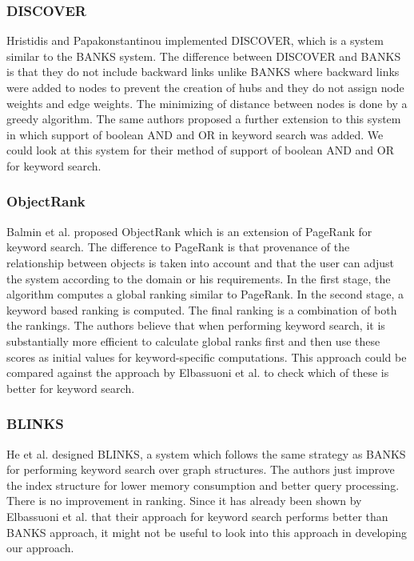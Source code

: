 \documentclass{article}
\begin{document}
    \subsubsection{DISCOVER}
    Hristidis and Papakonstantinou\cite{hristidis02} implemented DISCOVER, which is a system similar to the BANKS system. The difference between DISCOVER and BANKS is that they do not include backward links unlike BANKS where backward links were added to nodes to prevent the creation of hubs and they do not assign node weights and edge weights. The minimizing of distance between nodes is done by a greedy algorithm. The same authors proposed a further extension to this system\cite{hristidis03} in which support of boolean AND and OR in keyword search was added. We could look at this system for their method of support of boolean AND and OR for keyword search.

    \subsubsection{ObjectRank}
    Balmin et al.\cite{balmin04} proposed ObjectRank which is an extension of PageRank for keyword search. The difference to PageRank is that provenance of the relationship between objects is taken into account and that the user can adjust the system according to the domain or his requirements. In the first stage, the algorithm computes a global ranking similar to PageRank. In the second stage, a keyword based ranking is computed. The final ranking is a combination of both the rankings. The authors believe that when performing keyword search, it is substantially more efficient to calculate global ranks first and then use these scores as initial values for keyword-specific computations. This approach could be compared against the approach by Elbassuoni et al.\cite{elbassuoni08} to check which of these is better for keyword search.

    \subsubsection{BLINKS}
    He et al.\cite{he07} designed BLINKS, a system which follows the same strategy as BANKS\cite{bhalotia02} for performing keyword search over graph structures. The authors just improve the index structure for lower memory consumption and better query processing. There is no improvement in ranking. Since it has already been shown by Elbassuoni et al. that their approach\cite{elbassuoni08} for keyword search performs better than BANKS approach, it might not be useful to look into this approach in developing our approach.
\end{document}
